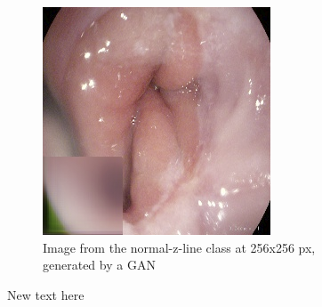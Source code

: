 \begin{figure}[t]
\begin{subfigure}[b]{0.4\textwidth}
            \includegraphics[width=\textwidth]{experiments/figures/greensquare/zGAN.png}
            \caption[]%
            {{\small Image from the normal-z-line class at 256x256 px, generated by a GAN }}    
            \label{fig:zGAN}
        \end{subfigure}
        \caption[ ]
        {\small New text here} 
        \label{fig:GC1GREEN}
    \end{figure}
    
